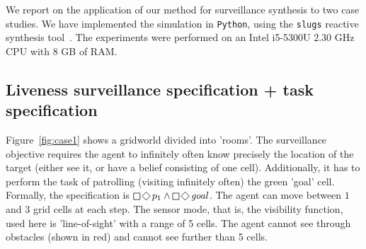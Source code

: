 We report on the application of our method for surveillance synthesis to two case studies. We have implemented the simulation in \texttt{Python}, using the \texttt{slugs} reactive synthesis tool~\cite{EhlersR16}. The experiments were performed on an Intel i5-5300U 2.30 GHz CPU with 8 GB of RAM. 

\subsection{Liveness surveillance specification + task specification}
Figure~\ref{fig:case1} shows a gridworld divided into  'rooms'. The surveillance objective requires the agent to infinitely often know precisely the location of the target (either see it, or have a belief consisting of one cell). Additionally, it has to perform the task of patrolling (visiting infinitely often) the green 'goal' cell. Formally, the specification is $\LTLglobally\LTLfinally p_1 \wedge \LTLglobally\LTLfinally \mathit{goal}$. The agent can move between $1$ and $3$ grid cells at each step. The sensor mode, that is, the visibility function, used here is 'line-of-sight' with a range of 5 cells. The agent cannot see through obstacles (shown in red) and cannot see further than 5 cells. 


